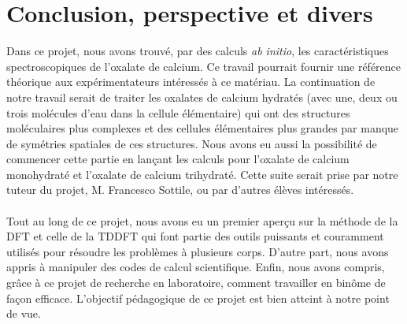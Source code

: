 \chapter{Conclusion, perspective et divers}
Dans ce projet, nous avons trouvé, par des calculs \textit{ab initio}, les caractéristiques spectroscopiques de l'oxalate de calcium. 
Ce travail pourrait fournir une référence théorique aux expérimentateurs intéressés à ce matériau.
La continuation de notre travail serait de traiter les oxalates de calcium hydratés (avec une, deux ou trois molécules d'eau dans la cellule élémentaire) qui ont des structures moléculaires plus complexes et des cellules élémentaires plus grandes par manque de symétries spatiales de ces structures.
Nous avons eu aussi la possibilité de commencer cette partie en lançant les calculs pour l'oxalate de calcium monohydraté et l'oxalate de calcium trihydraté. 
Cette suite serait prise par notre tuteur du projet, M. Francesco Sottile, ou par d'autres élèves intéressés. 
\\\\Tout au long de ce projet, nous avons eu un premier aperçu sur la méthode de la DFT et celle de la TDDFT qui font partie des outils puissants et couramment utilisés pour résoudre les problèmes à plusieurs corps. 
D'autre part, nous avons appris à manipuler des codes de calcul scientifique.
Enfin, nous avons compris, grâce à ce projet de recherche en laboratoire, comment travailler en binôme de façon efficace.
L'objectif pédagogique de ce projet est bien atteint à notre point de vue.